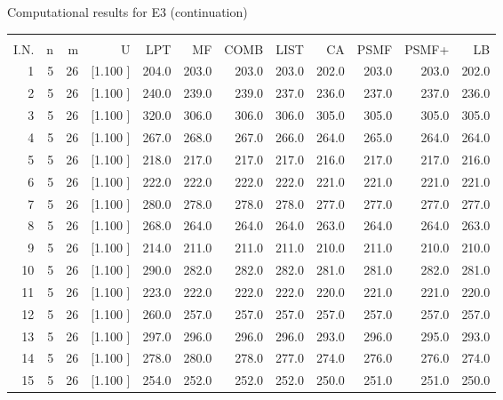 \documentclass[12pt,a4paper]{article}
\begin{document}
\newpage
\begin{center}
 Computational results for E3 (continuation) {\tiny
\begin{tabular}{r r r r r r r r r r r r}\hline
    &   &   &          &        &        &        &        &        &        &        &       \\[-0.1in]
  I.N.  &  n  &  m  &  U  &  LPT  &  MF  &  COMB  &  LIST  &  CA  & PSMF &PSMF+ & LB \\[0.03in]
\hline
   1&  5& 26&[1.100     ]&   204.0&   203.0&   203.0&   203.0&   202.0&   203.0&   203.0&   202.0\\[-0.02in]
   2&  5& 26&[1.100     ]&   240.0&   239.0&   239.0&   237.0&   236.0&   237.0&   237.0&   236.0\\[-0.02in]
   3&  5& 26&[1.100     ]&   320.0&   306.0&   306.0&   306.0&   305.0&   305.0&   305.0&   305.0\\[-0.02in]
   4&  5& 26&[1.100     ]&   267.0&   268.0&   267.0&   266.0&   264.0&   265.0&   264.0&   264.0\\[-0.02in]
   5&  5& 26&[1.100     ]&   218.0&   217.0&   217.0&   217.0&   216.0&   217.0&   217.0&   216.0\\[-0.02in]
   6&  5& 26&[1.100     ]&   222.0&   222.0&   222.0&   222.0&   221.0&   221.0&   221.0&   221.0\\[-0.02in]
   7&  5& 26&[1.100     ]&   280.0&   278.0&   278.0&   278.0&   277.0&   277.0&   277.0&   277.0\\[-0.02in]
   8&  5& 26&[1.100     ]&   268.0&   264.0&   264.0&   264.0&   263.0&   264.0&   264.0&   263.0\\[-0.02in]
   9&  5& 26&[1.100     ]&   214.0&   211.0&   211.0&   211.0&   210.0&   211.0&   210.0&   210.0\\[-0.02in]
  10&  5& 26&[1.100     ]&   290.0&   282.0&   282.0&   282.0&   281.0&   281.0&   282.0&   281.0\\[-0.02in]
  11&  5& 26&[1.100     ]&   223.0&   222.0&   222.0&   222.0&   220.0&   221.0&   221.0&   220.0\\[-0.02in]
  12&  5& 26&[1.100     ]&   260.0&   257.0&   257.0&   257.0&   257.0&   257.0&   257.0&   257.0\\[-0.02in]
  13&  5& 26&[1.100     ]&   297.0&   296.0&   296.0&   296.0&   293.0&   296.0&   295.0&   293.0\\[-0.02in]
  14&  5& 26&[1.100     ]&   278.0&   280.0&   278.0&   277.0&   274.0&   276.0&   276.0&   274.0\\[-0.02in]
  15&  5& 26&[1.100     ]&   254.0&   252.0&   252.0&   252.0&   250.0&   251.0&   251.0&   250.0\\[-0.02in]

\end{tabular}}
\end{center}
\end{document}
